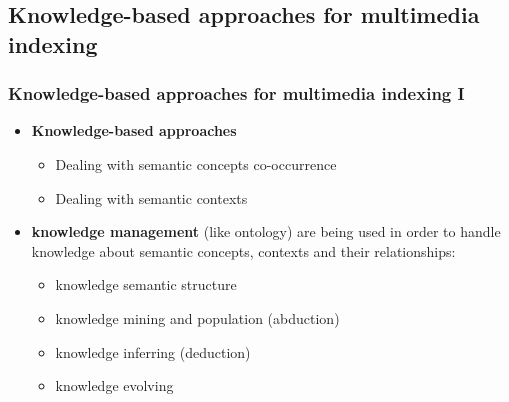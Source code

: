\subsection{Knowledge-based approaches for multimedia indexing}
\begin{frame}
	\frametitle{Knowledge-based approaches for multimedia indexing I}
	\begin{itemize}
		\item \textbf{Knowledge-based approaches}
		\begin{itemize}
			\item Dealing with semantic \alert{concepts co-occurrence} 
			      \\ {\tiny{\citep{Feng2012,Zheng2013}}}
			\item Dealing with semantic \alert{contexts} 
			      \\ {\tiny{\citep{Dumitrescu2009,PerpetualCoutinho2012}}}
		\end{itemize}
		\item \textbf{knowledge management} (like ontology) are being used in order to handle knowledge  
			about \alert{semantic concepts}, \alert{contexts} and their \alert{relationships}:
			{\tiny{\citep{Noy2001}}}
			\begin{itemize}
				\item knowledge semantic structure
				\item knowledge mining and population (\alert{abduction})
				\item knowledge inferring (\alert{deduction})
				\item knowledge evolving
			\end{itemize}
	\end{itemize}
\end{frame}

